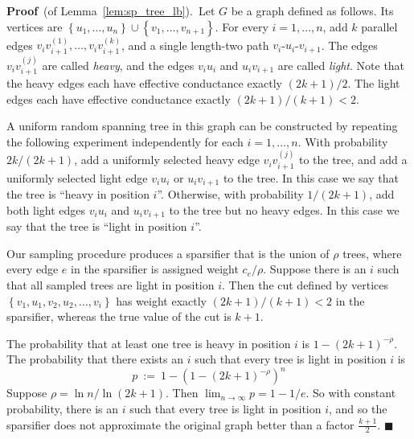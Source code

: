 \documentclass[11pt]{article}
\newcommand{\proofbelow}{8pt}
\numberwithin{equation}{section}
\newenvironment{proofof}[1]{\noindent\textbf{Proof} \,(of #1).\,}{\afterproof}
\newcommand{\afterproof}{\hfill $\blacksquare$ \par \vspace{\proofbelow}}
\newcommand{\union}{\cup}
\newcommand{\set}[1]{\left \{ #1 \right \}}                     \newcommand{\setst}[2]{\left\{\; #1 \,:\, #2 \;\right\}}
\newcommand{\Lemma}[1]{Lemma~\ref{lem:#1}}
\begin{document}
\vspace{6pt}
\begin{proofof}{\Lemma{sp_tree_lb}}
Let $G$ be a graph defined as follows.
Its vertices are $\set{u_1,\ldots,u_{n}} \union \set{v_1, \ldots, v_{n+1}}$.
For every $i=1,\ldots,n$, add $k$ parallel edges
$v_i v_{i+1}^{(1)}, \ldots, v_i v_{i+1}^{(k)}$,
and a single length-two path $v_i$-$u_i$-$v_{i+1}$.
The edges $v_i v_{i+1}^{(j)}$ are called \textit{heavy},
and the edges $v_i u_i$ and $u_i v_{i+1}$ are called \textit{light}.
Note that the heavy edges each have effective conductance exactly $(2k+1)/2$.
The light edges each have effective conductance exactly $(2k+1)/(k+1) < 2$.

A uniform random spanning tree in this graph can be constructed by repeating
the following experiment independently for each $i=1,\ldots,n$.
With probability $2k/(2k+1)$, add a uniformly selected heavy edge $v_i v_{i+1}^{(j)}$
to the tree, and add a uniformly selected light edge $v_i u_i$ or $u_i v_{i+1}$ to the tree.
In this case we say that the tree is ``heavy in position $i$''.
Otherwise, with probability $1/(2k+1)$, add both light edges $v_i u_i$ and $u_i v_{i+1}$ to the tree
but no heavy edges.
In this case we say that the tree is ``light in position $i$''.

Our sampling procedure produces a sparsifier that is the union of $\rho$ trees,
where every edge $e$ in the sparsifier is assigned weight $c_e / \rho$.
Suppose there is an $i$ such that all sampled trees are light in position $i$.
Then the cut defined by vertices $\set{v_1,u_1,v_2,u_2,\ldots,v_i}$
has weight exactly $(2k+1)/(k+1) < 2$ in the sparsifier,
whereas the true value of the cut is $k+1$.

The probability that at least one tree is heavy in position $i$ is $1-(2k+1)^{-\rho}$.
The probability that there exists an $i$ such that every tree is light in position $i$ is
$$
p ~:=~ 1-(1-(2k+1)^{-\rho})^n
$$
Suppose $\rho = \ln n/\ln(2k+1)$.
Then $\lim_{n \rightarrow \infty} p = 1-1/e$.
So with constant probability, there is an $i$ such that every tree is light in position $i$,
and so the sparsifier does not approximate the original graph better than a factor
$\frac{k+1}{2}$.
\end{proofof}










\appendix
\end{document}
